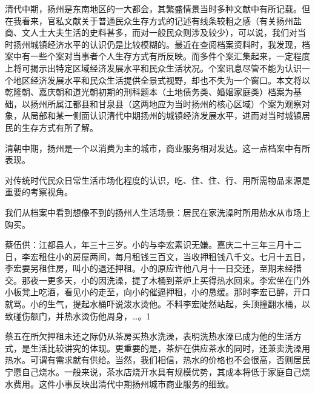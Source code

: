 清代中期，扬州是东南地区的一大都会，其繁盛情景当时多种文献中有所记载。但在我看来，官私文献关于普通民众生存方式的记述有线条较粗之感（有关扬州盐商、文人士大夫生活的史料甚多，而对一般民众则涉及较少），可以说，我们对当时扬州城镇经济水平的认识仍是比较模糊的。最近在查阅档案资料时，我发现，档案中有一些个案对当事者个人生存方式有所反映。而多件个案汇集起来，一定程度上将可揭示出特定区域经济发展水平和民众生活状况。个案讯息尽管不能为认识一个地区经济发展水平和民众生活提供全景式视野，却也不失为一个窗口。本文将以乾隆朝、嘉庆朝和道光朝初期的刑科题本（土地债务类、婚姻家庭类）档案为基础，以扬州所属江都县和甘泉县（这两地应为当时扬州的核心区域）个案为观察对象，从局部和某一侧面认识清代中期扬州的城镇经济发展水平，进而对当时城镇居民的生存方式有所了解。


清朝中期，扬州是一个以消费为主的城市，商业服务相对发达。这一点档案中有所表现。


对传统时代民众日常生活市场化程度的认识，吃、住、住、行、用所需物品来源是重要的考察视角。

\vfill
\begin{BookNotes}
\end{BookNotes}

我们从档案中看到想像不到的扬州人生活场景：居民在家洗澡时所用热水从市场上购买。

\begin{BookQuote}
蔡伍供：江都县人，年三十三岁。小的与李宏素识无嫌。嘉庆二十三年三月十二日，李宏租住小的房屋两间，每月租钱三百文，当收押租钱八千文。七月十五日，李宏要另租住房，叫小的退还押租。小的原应许他八月十一日交还，至期未经措交。那夜一更多天，小的因洗澡，提了木桶到茶炉上买得热水回来。李宏坐在门外小板凳上吃酒，看见小的走至，向小的催逼押租，小的恳缓。那时李宏已醉，开口就骂。小的生气，提起水桶吓说泼水烫他。不料李宏陡然站起，头顶撞翻水桶，以致碰伤额门，并热水烫伤他周身，…。1
\end{BookQuote}

蔡五在所欠押租未还之际仍从茶房买热水洗澡，表明洗热水澡已成为他的生活方式，是生活比较讲究的体现。更重要的是，茶炉在供应茶水的同时，还兼卖洗澡用热水。可谓有需求就有供给。当然，我们相信，热水的价格也不会很高，否则居民宁愿自己烧水。一般来说，茶水店烧开水具有规模优势，其成本将低于家庭自己烧水费用。这件小事反映出清代中期扬州城市商业服务的细致。

